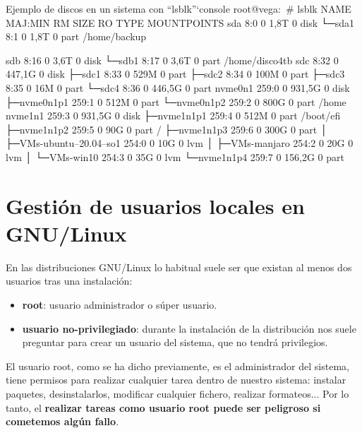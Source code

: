 \documentclass{../../../yukibook.cls/yukibook}
\begin{document}
\begin{mycode}{Ejemplo de discos en un sistema con ``lsblk''`}{console}{}
root@vega:~# lsblk
NAME                       MAJ:MIN RM   SIZE RO TYPE MOUNTPOINTS
sda                          8:0    0   1,8T  0 disk
└─sda1                       8:1    0   1,8T  0 part /home/backup

sdb                          8:16   0   3,6T  0 disk
└─sdb1                       8:17   0   3,6T  0 part /home/disco4tb
sdc                          8:32   0 447,1G  0 disk
├─sdc1                       8:33   0   529M  0 part
├─sdc2                       8:34   0   100M  0 part
├─sdc3                       8:35   0    16M  0 part
└─sdc4                       8:36   0 446,5G  0 part
nvme0n1                    259:0    0 931,5G  0 disk
├─nvme0n1p1                259:1    0   512M  0 part
└─nvme0n1p2                259:2    0   800G  0 part /home
nvme1n1                    259:3    0 931,5G  0 disk
├─nvme1n1p1                259:4    0   512M  0 part /boot/efi
├─nvme1n1p2                259:5    0    90G  0 part /
├─nvme1n1p3                259:6    0   300G  0 part
│ ├─VMs-ubuntu--20.04--so1 254:0    0    10G  0 lvm
│ ├─VMs-manjaro            254:2    0    20G  0 lvm
│ └─VMs-win10              254:3    0    35G  0 lvm
└─nvme1n1p4                259:7    0 156,2G  0 part
\end{mycode}


\chapter{Gestión de usuarios locales en GNU/Linux}
En las distribuciones GNU/Linux lo habitual suele ser que existan al menos dos usuarios tras una instalación:

\begin{itemize}
    \item \textbf{root}: usuario administrador o súper usuario.
    \item \textbf{usuario no-privilegiado}: durante la instalación de la distribución nos suele preguntar para crear un usuario del sistema, que no tendrá privilegios.
\end{itemize}


El usuario root, como se ha dicho previamente, es el administrador del sistema, tiene permisos para realizar cualquier tarea dentro de nuestro sistema: instalar paquetes, desinstalarlos, modificar cualquier fichero, realizar formateos... Por lo tanto, el \textbf{realizar tareas como usuario root puede ser peligroso si cometemos algún fallo}.
\end{document}
